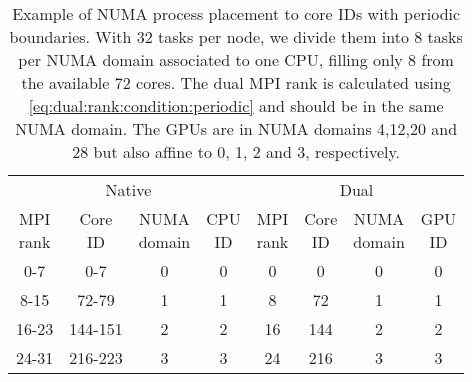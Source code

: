 \begin{table}[h]
\centering
\begin{tabular}{cccccccc}
\multicolumn{4}{c}{Native} & \multicolumn{4}{c}{Dual} \\
\cmidrule(lr){1-4}
\cmidrule(lr){5-8} 
\makecell{MPI\\rank} &
\makecell{Core\\ID} &
\makecell{NUMA\\domain} &
\makecell{CPU\\ID} &
\makecell{MPI\\rank} &
\makecell{Core\\ID} &
\makecell{NUMA\\domain} &
\makecell{GPU\\ID} \\
\cmidrule(lr){1-4}
\cmidrule(lr){5-8} 
0-7   & 0-7     & 0 & 0 & 0  & 0   & 0 & 0 \\
8-15  & 72-79   & 1 & 1 & 8  & 72  & 1 & 1 \\
16-23 & 144-151 & 2 & 2 & 16 & 144 & 2 & 2 \\
24-31 & 216-223 & 3 & 3 & 24 & 216 & 3 & 3 \\
\end{tabular}
\caption{Example of NUMA process placement to core IDs with periodic boundaries. With \num{32} tasks per node, we divide them into \num{8} tasks per NUMA domain associated to one CPU, filling only \num{8} from the available \num{72} cores. The dual MPI rank is calculated using \cref{eq:dual:rank:condition:periodic} and should be in the same NUMA domain. The GPUs are in NUMA domains \num{4},\num{12},\num{20} and \num{28} but also affine to \num{0}, \num{1}, \num{2} and \num{3}, respectively.}
\label{tab:perf:numa:periodic}
\end{table}

